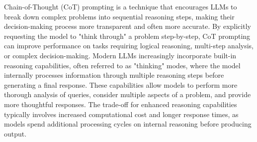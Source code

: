 Chain-of-Thought (CoT) prompting is a technique that encourages LLMs to break down complex problems into sequential reasoning steps, making their decision-making process more transparent and often more accurate.
By explicitly requesting the model to "think through" a problem step-by-step, CoT prompting can improve performance on tasks requiring logical reasoning, multi-step analysis, or complex decision-making.
Modern LLMs increasingly incorporate built-in reasoning capabilities, often referred to as "thinking" modes, where the model internally processes information through multiple reasoning steps before generating a final response.
These capabilities allow models to perform more thorough analysis of queries, consider multiple aspects of a problem, and provide more thoughtful responses.
The trade-off for enhanced reasoning capabilities typically involves increased computational cost and longer response times, as models spend additional processing cycles on internal reasoning before producing output.
